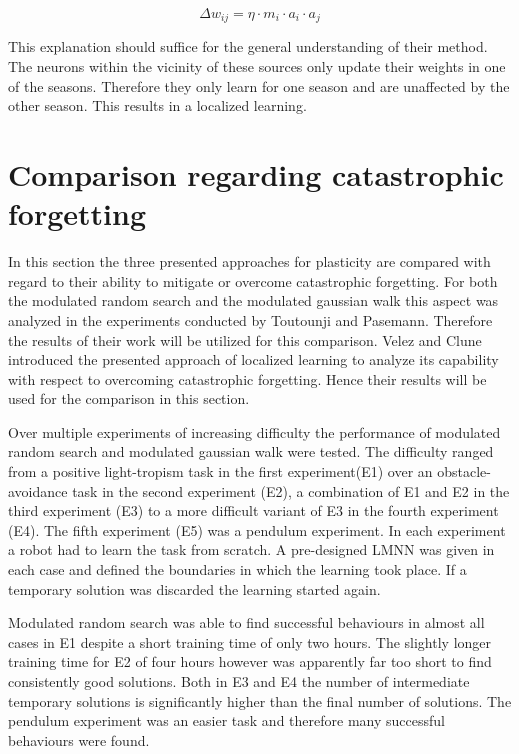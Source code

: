 \documentclass[12pt,twoside]{scrartcl}
\theoremstyle{plain}
\theoremstyle{definition}
\theoremstyle{remark}
\begin{document}
\[
    \Delta w_{ij} = \eta \cdot m_i \cdot a_i \cdot a_j
\]

This explanation should suffice for the general understanding of their method.
The neurons within the vicinity of these sources only update their weights
in one of the seasons. Therefore they only learn for one season and are unaffected
by the other season. This results in a localized learning.

\section{Comparison regarding catastrophic forgetting}
\label{sec:comparison}

In this section the three presented approaches for plasticity are compared with
regard to their ability to mitigate or overcome catastrophic forgetting. For both
the modulated random search and the modulated gaussian walk this aspect was
analyzed in the experiments conducted by Toutounji and Pasemann\cite{Toutounji2016}.
Therefore the results of their work will be utilized for this comparison.
Velez and Clune\cite{Velez2017} introduced the presented approach of localized
learning to analyze its capability with respect to overcoming catastrophic
forgetting. Hence their results will be used for the comparison in this section.

Over multiple experiments of increasing difficulty the performance of modulated
random search and modulated gaussian walk were tested. The difficulty ranged
from a positive light-tropism task in the first experiment(E1) over an
obstacle-avoidance task in the second experiment (E2), a combination of E1 and E2
in the third experiment (E3) to a more difficult variant of E3 in the fourth
experiment (E4). The fifth experiment (E5) was a pendulum experiment.
In each experiment a robot had to learn the task from scratch. A pre-designed
LMNN was given in each case and defined the boundaries in which the learning
took place. If a temporary solution was discarded the learning started again.

Modulated random search was able to find successful behaviours in almost all
cases in E1 despite a short training time of only two hours. The slightly
longer training time for E2 of four hours however was apparently far too short
to find consistently good solutions. Both in E3 and E4 the number of intermediate
temporary solutions is significantly higher than the final number of solutions.
The pendulum experiment was an easier task and therefore many successful
behaviours were found.
\end{document}
